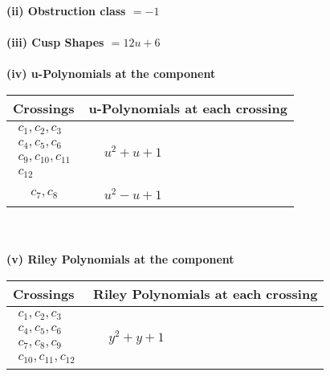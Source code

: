 \documentclass[1p]{elsarticle_modified}
\theoremstyle{definition}
\begin{document}
\flushleft \textbf{(ii) Obstruction class $= -1$}\\~\\
\flushleft \textbf{(iii) Cusp Shapes $= 12 u+6$}\\~\\
\newpage\renewcommand{\arraystretch}{1}
\flushleft \textbf{(iv) u-Polynomials at the component}\newline \\
\begin{tabular}{m{50pt}|m{274pt}}
Crossings & \hspace{64pt}u-Polynomials at each crossing \\
\hline $$\begin{aligned}c_{1},c_{2},c_{3}\\c_{4},c_{5},c_{6}\\c_{9},c_{10},c_{11}\\c_{12}\end{aligned}$$&$\begin{aligned}
&u^2+u+1
\end{aligned}$\\
\hline $$\begin{aligned}c_{7},c_{8}\end{aligned}$$&$\begin{aligned}
&u^2- u+1
\end{aligned}$\\
\hline
\end{tabular}\\~\\
\newpage\renewcommand{\arraystretch}{1}
\flushleft \textbf{(v) Riley Polynomials at the component}\newline \\
\begin{tabular}{m{50pt}|m{274pt}}
Crossings & \hspace{64pt}Riley Polynomials at each crossing \\
\hline $$\begin{aligned}c_{1},c_{2},c_{3}\\c_{4},c_{5},c_{6}\\c_{7},c_{8},c_{9}\\c_{10},c_{11},c_{12}\end{aligned}$$&$\begin{aligned}
&y^2+y+1
\end{aligned}$\\
\hline
\end{tabular}\\~\\
\end{document}
